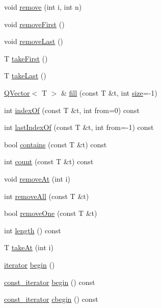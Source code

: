 \begin{DoxyCompactItemize}
void \hyperlink{class_q_vector_aea3b154a0eaf41cb19cf9a916e426a33}{remove} (int i, int n)
\item 
void \hyperlink{class_q_vector_a93907fcd36758247f6d6e074240f9f02}{remove\+First} ()
\item 
void \hyperlink{class_q_vector_a601a6ef4768c988b5ce96e05a8449f64}{remove\+Last} ()
\item 
T \hyperlink{class_q_vector_a96a07a40f38b70e6c71fc3f01749636b}{take\+First} ()
\item 
T \hyperlink{class_q_vector_a81212706ea7a741742d342d0c370a783}{take\+Last} ()
\item 
\hyperlink{class_q_vector}{Q\+Vector}$<$ T $>$ \& \hyperlink{class_q_vector_aa508b6403bbbe6f81b67d0c9257b7d2b}{fill} (const T \&t, int \hyperlink{class_q_vector_aa5739a6bcb52f9b9532ac661cca45b8b}{size}=-\/1)
\item 
int \hyperlink{class_q_vector_a015c576d25fc9707466b3b301e10f33d}{index\+Of} (const T \&t, int from=0) const 
\item 
int \hyperlink{class_q_vector_a06149e241b9907f6c2b379c4e5279338}{last\+Index\+Of} (const T \&t, int from=-\/1) const 
\item 
bool \hyperlink{class_q_vector_a048b668c8baf8e2503656a751e73ddad}{contains} (const T \&t) const 
\item 
int \hyperlink{class_q_vector_a0ba5f2f633ab9eb813e6433464f095a6}{count} (const T \&t) const 
\item 
void \hyperlink{class_q_vector_a33bedda19185b72dcaa008f52ddd3ed0}{remove\+At} (int i)
\item 
int \hyperlink{class_q_vector_aa78630cc416f99d5d1984ea402da9516}{remove\+All} (const T \&t)
\item 
bool \hyperlink{class_q_vector_aae46c554ac81f614f376425cef90149d}{remove\+One} (const T \&t)
\item 
int \hyperlink{class_q_vector_a44cb545af1984e4c9432b0cc57525664}{length} () const 
\item 
T \hyperlink{class_q_vector_a47372e861a3e52af5d2ea6ee29bc5de0}{take\+At} (int i)
\item 
\hyperlink{class_q_vector_af6ac26e0dfede6e3045be0c947201267}{iterator} \hyperlink{class_q_vector_ad0c2c0e80b789c3a78a8c3a32dba31cc}{begin} ()
\item 
\hyperlink{class_q_vector_a01e19bfad7fefd3e97ef197f4ed2cceb}{const\+\_\+iterator} \hyperlink{class_q_vector_af4315069a3caf05631993ec7d57881fa}{begin} () const 
\item 
\hyperlink{class_q_vector_a01e19bfad7fefd3e97ef197f4ed2cceb}{const\+\_\+iterator} \hyperlink{class_q_vector_a4ccddab5fdd95438143d5dbb17afc404}{cbegin} () const 

\end{DoxyCompactItemize}
